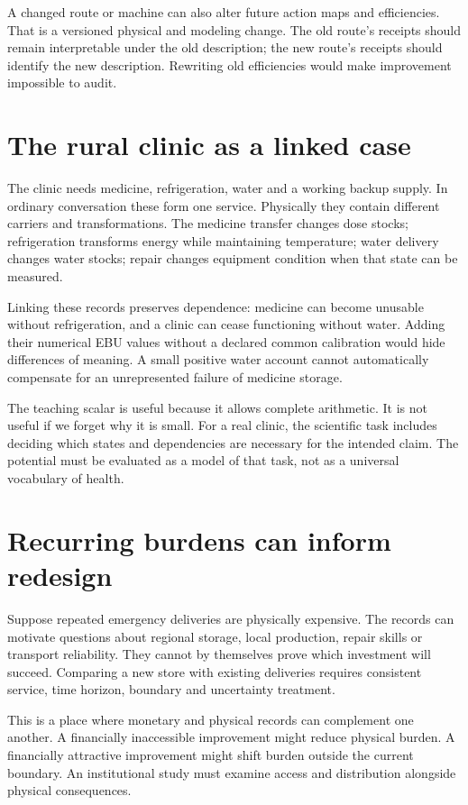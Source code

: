 A changed route or machine can also alter future action maps and efficiencies. That is a versioned physical and modeling change. The old route's receipts should remain interpretable under the old description; the new route's receipts should identify the new description. Rewriting old efficiencies would make improvement impossible to audit.

\section{The rural clinic as a linked case}
The clinic needs medicine, refrigeration, water and a working backup supply. In ordinary conversation these form one service. Physically they contain different carriers and transformations. The medicine transfer changes dose stocks; refrigeration transforms energy while maintaining temperature; water delivery changes water stocks; repair changes equipment condition when that state can be measured.

Linking these records preserves dependence: medicine can become unusable without refrigeration, and a clinic can cease functioning without water. Adding their numerical EBU values without a declared common calibration would hide differences of meaning. A small positive water account cannot automatically compensate for an unrepresented failure of medicine storage.

The teaching scalar is useful because it allows complete arithmetic. It is not useful if we forget why it is small. For a real clinic, the scientific task includes deciding which states and dependencies are necessary for the intended claim. The potential must be evaluated as a model of that task, not as a universal vocabulary of health.

\section{Recurring burdens can inform redesign}
Suppose repeated emergency deliveries are physically expensive. The records can motivate questions about regional storage, local production, repair skills or transport reliability. They cannot by themselves prove which investment will succeed. Comparing a new store with existing deliveries requires consistent service, time horizon, boundary and uncertainty treatment.

This is a place where monetary and physical records can complement one another. A financially inaccessible improvement might reduce physical burden. A financially attractive improvement might shift burden outside the current boundary. An institutional study must examine access and distribution alongside physical consequences.

